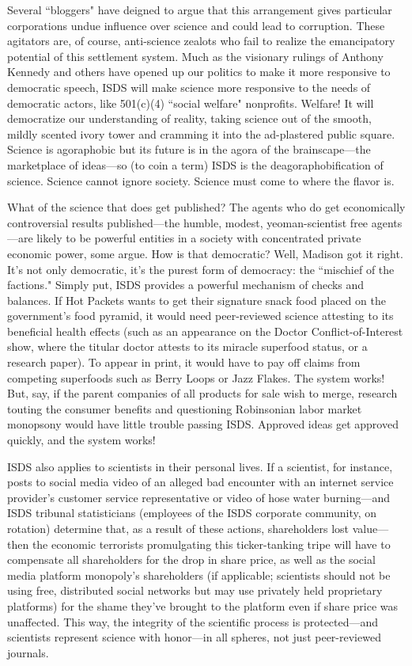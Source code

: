 Several ``bloggers" have deigned to argue that this arrangement gives particular corporations undue influence over science and could lead to corruption. These agitators are, of course, anti-science zealots who fail to realize the emancipatory potential of this settlement system. Much as the visionary rulings of Anthony Kennedy and others have opened up our politics to make it more responsive to democratic speech, ISDS will make science more responsive to the needs of democratic actors, like 501(c)(4) ``social welfare" nonprofits. Welfare! It will democratize our understanding of reality, taking science out of the smooth, mildly scented ivory tower and cramming it into the ad-plastered public square. Science is agoraphobic but its future is in the agora of the brainscape---the marketplace of ideas---so (to coin a term) ISDS is the deagoraphobification of science. Science cannot ignore society. Science must come to where the flavor is.

What of the science that does get published? The agents who do get economically controversial results published---the humble, modest, yeoman-scientist free agents---are likely to be powerful entities in a society with concentrated private economic power, some argue. How is that democratic? Well, Madison got it right. It's not only democratic, it's the purest form of democracy: the ``mischief of the factions." Simply put, ISDS provides a powerful mechanism of checks and balances. If Hot Packets wants to get their signature snack food placed on the government's food pyramid, it would need peer-reviewed science attesting to its beneficial health effects (such as an appearance on the Doctor Conflict-of-Interest show, where the titular doctor attests to its miracle superfood status, or a research paper). To appear in print, it would have to pay off claims from competing superfoods such as Berry Loops or Jazz Flakes. The system works! But, say, if the parent companies of all products for sale wish to merge, research touting the consumer benefits and questioning Robinsonian labor market monopsony would have little trouble passing ISDS. Approved ideas get approved quickly, and the system works!

ISDS also applies to scientists in their personal lives. If a scientist, for instance, posts to social media video of an alleged bad encounter with an internet service provider's customer service representative or video of hose water burning---and ISDS tribunal statisticians (employees of the ISDS corporate community, on rotation) determine that, as a result of these actions, shareholders lost value---then the economic terrorists promulgating this ticker-tanking tripe will have to compensate all shareholders for the drop in share price, as well as the social media platform monopoly's shareholders (if applicable; scientists should not be using free, distributed social networks but may use privately held proprietary platforms) for the shame they've brought to the platform even if share price was unaffected. This way, the integrity of the scientific process is protected---and scientists represent science with honor---in all spheres, not just peer-reviewed journals.   

